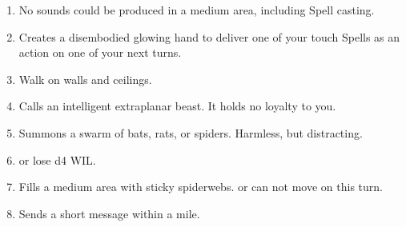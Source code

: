 \documentclass[itdr]{subfiles}
\begin{document}
\begin{enumerate}
	\item {} No sounds could be produced in a medium area, including Spell casting.
	\item {} Creates a disembodied glowing hand to deliver one of your touch Spells as an action on one of your next turns.
	\item {} Walk on walls and ceilings.
	\item {} Calls an intelligent extraplanar beast. It holds no loyalty to you.
	\item {} Summons a swarm of bats, rats, or spiders. Harmless, but distracting.
	\item {}  or lose d4 WIL.
	\item {} Fills a medium area with sticky spiderwebs.  or can not move on this turn.
	\item {} Sends a short message within a mile.
\end{enumerate}

\vfill
\break
\end{document}
